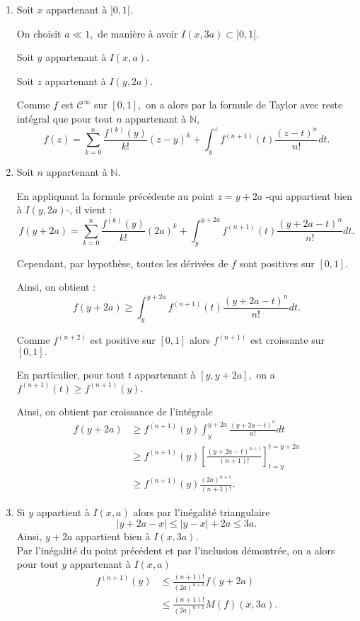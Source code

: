 \begin{enumerate}
\item Soit $x$ appartenant \`{a} $]0,1[.$ 

On choisit $a\ll 1,$ de manière à avoir $I(x,3a)\subset ]0,1[.$

Soit $y$ appartenant \`{a} $I(x,a).$ 

Soit $z$ appartenant \`{a} $I(y,2a).$

Comme $f$ est $\mathcal{C}^{\infty}$ sur $[0,1],$ on a alors par la formule de Taylor avec reste int\'{e}gral que pour tout $n$ appartenant \`{a} $\mathbb{N},$ $$f(z)=\sum_{k=0}^{n}\frac{f^{(k)}(y)}{k!}(z-y)^{k}+\int_{y}^{z}f^{(n+1)}(t)\frac{(z-t)^{n}}{n!}dt.$$

\item Soit $n$ appartenant \`{a} $\mathbb{N}.$ 

En appliquant la formule pr\'{e}c\'{e}dente au point $z=y+2a$ -qui appartient bien \`{a} $I(y,2a)$-, il vient : 
$$f(y+2a) = \sum_{k=0}^{n}\frac{f^{(k)}(y)}{k!}(2a)^{k}+\int_{y}^{y+2a}f^{(n+1)}(t)\frac{(y+2a-t)^{n}}{n!}dt.$$

Cependant, par hypoth\`{e}se, toutes les d\'{e}riv\'{e}es de $f$ sont positives sur $[0,1].$ 

Ainsi, on obtient :  $$f(y+2a)\geq\int_{y}^{y+2a}f^{(n+1)}(t)\frac{(y+2a-t)^{n}}{n!}dt.$$

Comme $f^{(n+2)}$ est positive sur $[0,1]$ alors $f^{(n+1)}$ est croissante sur $[0,1].$ 

En particulier, pour tout $t$ appartenant \`{a} $[y,y+2a],$ on a $\displaystyle f^{(n+1)}(t)\geq f^{(n+1)}(y).$ 

Ainsi, on obtient par croissance de l'int\'{e}grale 
\begin{align*}
f(y+2a) & \geq f^{(n+1)}(y)\int_{y}^{y+2a}\frac{(y+2a-t)^{n}}{n!}dt\\
& \geq f^{(n+1)}(y)\left[\frac{(y+2a-t)^{n+1}}{(n+1)!}\right]_{t=y}^{t=y+2a}\\
& \geq f^{(n+1)}(y)\frac{(2a)^{n+1}}{(n+1)!}.
\end{align*}

\item Si $y$ appartient \`{a} $I(x,a)$ alors par l'in\'{e}galit\'{e} triangulaire $$\vert y+2a-x \vert \leq \vert y-x \vert +2a \leq 3a.$$ Ainsi, $y+2a$ appartient bien \`{a} $I(x,3a).$ 
\\

Par l'in\'{e}galit\'{e} du point pr\'{e}c\'{e}dent et par l'inclusion d\'{e}montr\'{e}e, on a alors pour tout $y$ appartenant \`{a} $I(x,a)$ 
\begin{align*}
f^{(n+1)}(y) & \leq \frac{(n+1)!}{(2a)^{n+1}}f(y+2a)\\
& \leq \frac{(n+1)!}{(2a)^{n+1}}M(f)(x,3a).
\end{align*}


\end{enumerate}
